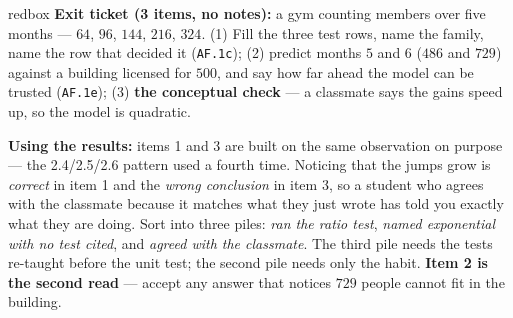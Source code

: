 \documentclass[10pt]{article}
\begin{document}
\boxguard[16]
\begin{skillbox}{redbox}
\textbf{Exit ticket (3 items, no notes):} a gym counting members over five months --- $64$, $96$,
$144$, $216$, $324$. (1) Fill the three test rows, name the family, name the row that decided it
(\texttt{AF.1c}); (2) predict months $5$ and $6$ ($486$ and $729$) against a building licensed for
$500$, and say how far ahead the model can be trusted (\texttt{AF.1e}); (3) \textbf{the conceptual
check} --- a classmate says the gains speed up, so the model is quadratic.

\textbf{Using the results:} items 1 and 3 are built on the same observation on purpose --- the
2.4/2.5/2.6 pattern used a fourth time. Noticing that the jumps grow is \emph{correct} in item 1 and
the \emph{wrong conclusion} in item 3, so a student who agrees with the classmate because it matches
what they just wrote has told you exactly what they are doing. Sort into three piles: \emph{ran the
ratio test}, \emph{named exponential with no test cited}, and \emph{agreed with the classmate}. The
third pile needs the tests re-taught before the unit test; the second pile needs only the habit.
\textbf{Item 2 is the second read} --- accept any answer that notices $729$ people cannot fit in the
building.
\end{skillbox}
\end{document}

